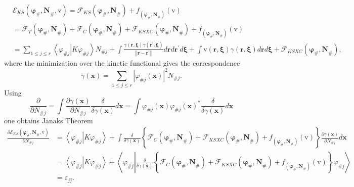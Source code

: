 \documentclass[aps,preprint]{revtex4}%
\begin{document}
\begin{align}
&  \mathcal{E}_{KS}\left(  \mathbf{\varphi}_{\#}\mathbf{,N}_{\#}%
\mathbf{,}\mathrm{v}\right)  =\mathcal{F}_{KS}\left(  \mathbf{\varphi}%
_{\#}\mathbf{,N}_{\#}\right)  +f_{\left(  \mathbf{\varphi}_{\#}\mathbf{,N}%
_{\#}\right)  }\left(  \mathrm{v}\right) \nonumber\\
&  =\mathcal{F}_{T}\left(  \mathbf{\varphi}_{\#}\mathbf{,N}_{\#}\right)
+\mathcal{F}_{C}\left(  \mathbf{\varphi}_{\#}\mathbf{,N}_{\#}\right)
+\mathcal{F}_{KSXC}\left(  \mathbf{\varphi}_{\#}\mathbf{,N}_{\#}\right)
+f_{\left(  \mathbf{\varphi}_{\#}\mathbf{,N}_{\#}\right)  }\left(
\mathrm{v}\right) \nonumber\\
&  =\sum_{1\leq j\leq r}\left\langle \varphi_{\#j}\left\vert K\varphi
_{\#j}\right.  \right\rangle N_{\#j}+\int\frac{\gamma\left(  \mathbf{r,\xi
}\right)  \gamma\left(  \mathbf{r}^{\prime}\mathbf{,\xi}\right)  }{\left\Vert
\mathbf{r-r}^{\prime}\right\Vert }d\mathbf{r}d\mathbf{r}^{\prime}d\mathbf{\xi
}+\int\mathrm{v}\left(  \mathbf{r,\xi}\right)  \gamma\left(  \mathbf{r,\xi
}\right)  d\mathbf{r}d\mathbf{\xi}+\mathcal{F}_{KSXC}\left(  \mathbf{\varphi
}_{\#}\mathbf{,N}_{\#}\right)  ,
\end{align}
where the minimization over the kinetic functional gives the correspondence
\begin{equation}
\gamma\left(  \mathbf{x}\right)  =\sum_{1\leq j\leq r}\left\vert \varphi
_{\#j}\left(  \mathbf{x}\right)  \right\vert ^{2}N_{\#j}.
\end{equation}
Using
\begin{equation}
\frac{\partial}{\partial N_{\#j}}=\int\frac{\partial\gamma\left(
\mathbf{x}\right)  }{\partial N_{\#j}}\frac{\delta}{\delta\gamma\left(
\mathbf{x}\right)  }d\mathbf{x=}\int\varphi_{\#j}\left(  \mathbf{x}\right)
\varphi_{\#j}\left(  \mathbf{x}\right)  ^{\ast}\frac{\delta}{\delta
\gamma\left(  \mathbf{x}\right)  }d\mathbf{x} \label{DerNj}%
\end{equation}
one obtains Janaks Theorem
\begin{align}
\frac{\partial\mathcal{E}_{KS}\left(  \mathbf{\varphi}_{\#}\mathbf{,N}%
_{\#}\mathbf{,}\mathrm{v}\right)  }{\partial N_{\#j}}  &  =\left\langle
\varphi_{\#j}\left\vert K\varphi_{\#j}\right.  \right\rangle +\int\frac
{\delta}{\delta\gamma\left(  \mathbf{x}\right)  }\left\{  \mathcal{F}%
_{C}\left(  \mathbf{\varphi}_{\#}\mathbf{,N}_{\#}\right)  +\mathcal{F}%
_{KSXC}\left(  \mathbf{\varphi}_{\#}\mathbf{,N}_{\#}\right)  +f_{\left(
\mathbf{\varphi}_{\#}\mathbf{,N}_{\#}\right)  }\left(  \mathrm{v}\right)
\right\}  \frac{\partial\gamma\left(  \mathbf{x}\right)  }{\partial N_{\#j}%
}d\mathbf{x}\nonumber\\
&  =\left\langle \varphi_{\#j}\left\vert K\varphi_{\#j}\right.  \right\rangle
+\left\langle \varphi_{\#j}\left\vert \frac{\delta}{\delta\gamma\left(
\mathbf{x}\right)  }\left\{  \mathcal{F}_{C}\left(  \mathbf{\varphi}%
_{\#}\mathbf{,N}_{\#}\right)  +\mathcal{F}_{KSXC}\left(  \mathbf{\varphi}%
_{\#}\mathbf{,N}_{\#}\right)  +f_{\left(  \mathbf{\varphi}_{\#}\mathbf{,N}%
_{\#}\right)  }\left(  \mathrm{v}\right)  \right\}  \right.  \varphi
_{\#j}\right\rangle \nonumber\\
&  =\varepsilon_{jj}.
\end{align}
\end{document}

